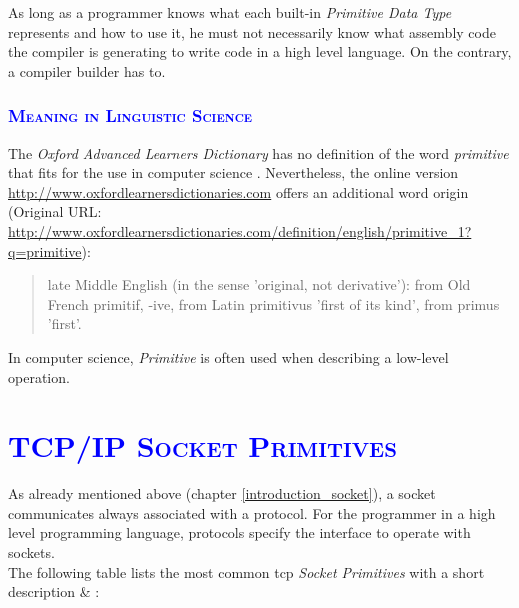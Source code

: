 \documentclass[xcolor=dvipsnames]{article}
\begin{document}
\noindent As long as a programmer knows what each built-in \textit{Primitive Data Type} represents and how to use it, he must not necessarily know what assembly code the compiler is generating to write code in a high level language. On the contrary, a compiler builder has to.\\

\subsubsection{\scshape{\textcolor{blue}{Meaning in Linguistic Science}}}

\noindent The \textit{Oxford Advanced Learners Dictionary} has no definition of the word \textit{primitive} that fits for the use in computer science \cite[p. 1197]{oxford_dictionary}. Nevertheless, the online version \url{http://www.oxfordlearnersdictionaries.com} offers an additional word origin (Original URL: \url{http://www.oxfordlearnersdictionaries.com/definition/english/primitive_1?q=primitive}):

\begin{quote}
late Middle English (in the sense 'original, not derivative'): from Old French primitif, -ive, from Latin primitivus 'first of its kind', from primus 'first'.
\end{quote}

\noindent In computer science, \textit{Primitive} is often used when describing a low-level operation. 

\section{\scshape{\textcolor{blue}{TCP/IP Socket Primitives}}} \label{socket_primitives}

As already mentioned above (chapter \ref{introduction_socket}), a socket communicates always associated with a protocol. For the programmer in a high level programming language, protocols specify the interface to operate with sockets.\\

\noindent The following table lists the most common \gls{tcp} \textit{Socket Primitives} with a short description \cite{IBM_Anupama} \& \cite[p. 142, ch. 4.3.1]{tanenbaum}:\\
\end{document}
